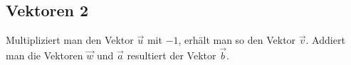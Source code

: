 \documentclass{article}
\begin{document}
    \subsection{Vektoren 2}
    \begin{figure}[h]
        \centering
    \end{figure}
    Multipliziert man den Vektor $\vec{u}$ mit $-1$, erhält man so den Vektor $\vec{v}$.
    Addiert man die Vektoren $\vec{w}$ und $\vec{a}$ resultiert der Vektor $\vec{b}$.

    \newpage
\end{document}
